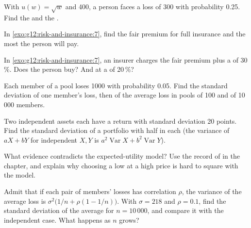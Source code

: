 \begin{exercise}[$\star\star$]\label{exo:g12:risk-and-insurance:7}
With $u(w) = \sqrt{w}$ and  400, a person faces a loss of 300 with probability 0.25. Find the  and the .
\end{exercise}

\begin{exercise}[$\star\star$]\label{exo:g12:risk-and-insurance:8}
In \cref{exo:g12:risk-and-insurance:7}, find the fair premium for full insurance and the most the person will pay.
\end{exercise}

\begin{exercise}[$\star\star$]\label{exo:g12:risk-and-insurance:9}
In \cref{exo:g12:risk-and-insurance:7}, an insurer charges the fair premium plus a  of 30\,\%. Does the person buy? And at a  of 20\,\%?
\end{exercise}

\begin{exercise}[$\star\star$]\label{exo:g12:risk-and-insurance:10}
Each member of a pool loses 1000 with probability 0.05. Find the standard deviation of one member's loss, then of the average loss in pools of 100 and of 10\,000
members.
\end{exercise}

\begin{exercise}[$\star\star$]\label{exo:g12:risk-and-insurance:11}
Two independent assets each have a return with standard deviation 20 points. Find the standard deviation of a portfolio with half in each (the variance of $aX + bY$ for
independent $X, Y$ is $a^2\operatorname{Var}X + b^2\operatorname{Var}Y$).
\end{exercise}

\begin{exercise}[$\star\star\star$]\label{exo:g12:risk-and-insurance:12}
What evidence contradicts the expected-utility model? Use the record of  in the chapter, and explain why choosing a low  at a high price is hard to
square with the model.
\end{exercise}

\begin{exercise}[$\star\star\star$]\label{exo:g12:risk-and-insurance:13}
Admit that if each pair of members' losses has correlation $\rho$, the variance of the average loss is $\sigma^2\bigl(1/n + \rho(1 - 1/n)\bigr)$. With $\sigma = 218$ and
$\rho = 0.1$, find the standard deviation of the average for $n = 10\,000$, and compare it with the independent case. What happens as $n$ grows?
\end{exercise}

